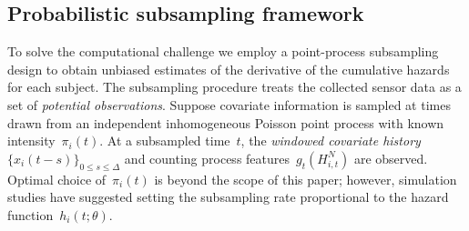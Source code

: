 \documentclass[12pt]{amsart}
\newtheorem{rmk}[thm]{Remark}%
\begin{document}

\subsection{Probabilistic subsampling framework}

To solve the computational challenge we employ a point-process subsampling design to obtain unbiased estimates of the derivative of the cumulative hazards for each subject. The subsampling procedure treats the collected sensor data as a set of \emph{potential observations}. Suppose covariate information is sampled at times drawn from an independent inhomogeneous Poisson point process with known intensity~$\pi_i (t)$. At a subsampled time~$t$, the \emph{windowed covariate history} $\{ x_i (t-s)\}_{0 \leq s \leq \Delta}$ and counting process features~$g_t (H_{i,t}^N)$ are observed. Optimal choice of~$\pi_i (t)$ is beyond the scope of this paper; however, simulation studies have suggested setting the subsampling rate proportional to the hazard function~$h_i (t; \theta)$.
\end{document}
